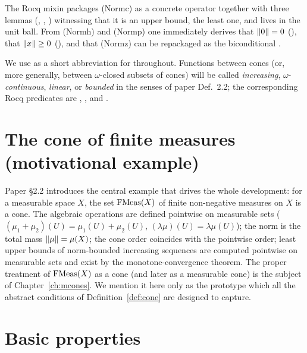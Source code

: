 The Rocq mixin packages (Normc) as a concrete operator
together with three lemmas
(,
,
)
witnessing that it is an upper bound, the least one, and lives in the
unit ball. From (Normh) and (Normp) one immediately derives that
$\lVert 0 \rVert = 0$ (), that
$\lVert x \rVert \geq 0$ (), and
that (Normz) can be repackaged as the biconditional
.

We use  as a short abbreviation for
 throughout. Functions between
cones (or, more generally, between $\omega$-closed subsets of cones)
will be called \emph{increasing}, $\omega$-\emph{continuous},
\emph{linear}, or \emph{bounded} in the senses of paper Def.~2.2;
the corresponding Rocq predicates are
,
, and
.

\section{The cone of finite measures (motivational example)}\label{sec:cone-fmeas}

Paper \S2.2 introduces the central example that drives the whole
development: for a measurable space $X$, the set $\mathrm{FMeas}(X)$ of finite
non-negative measures on $X$ is a cone. The algebraic operations are
defined pointwise on measurable sets ($(\mu_1 + \mu_2)(U) =
\mu_1(U) + \mu_2(U)$, $(\lambda \mu)(U) = \lambda \mu(U)$); the norm
is the total mass $\lVert \mu \rVert = \mu(X)$; the cone order coincides
with the pointwise order; least upper bounds of norm-bounded
increasing sequences are computed pointwise on measurable sets and
exist by the monotone-convergence theorem. The proper treatment of
$\mathrm{FMeas}(X)$ as a cone (and later as a measurable cone) is the subject
of Chapter~\ref{ch:mcones}. We mention it here only as the prototype
which all the abstract conditions of Definition~\ref{def:cone} are
designed to capture.

\section{Basic properties}\label{sec:cone-basic-lemmas}

